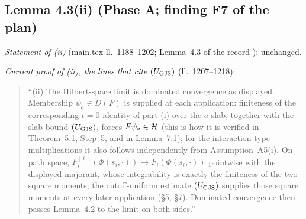 \subsection{Lemma 4.3(ii) (Phase A; finding F7 of the plan)}\label{sub:cons-43}

\emph{Statement of (ii)} (main.tex ll.~1188--1202; Lemma~4.3 of the record \cite[p.~17]{R}):
unchanged.

\emph{Current proof of (ii), the lines that cite $(U_{\rm GJS})$} (ll.~1207--1218):
\begin{quote}\small
``(ii) The Hilbert-space limit is dominated convergence as displayed. Membership
$\psi_a\in D(F)$ is supplied at each application: finiteness of the corresponding $t=0$ identity
of part (i) over the $a$-slab, together with the slab bound $(U_{\rm GJS})$, forces $F\psi_a\in\mathcal{H}$
(this is how it is verified in Theorem~5.1, Step~5, and in Lemma~7.1); for the interaction-type
multiplications it also follows independently from Assumption~A5(i). On path space,
$F_i^{[\ell]}(\Phi(s_i,\cdot))\to F_i(\Phi(s_i,\cdot))$ pointwise with the displayed majorant,
whose integrability is exactly the finiteness of the two square moments; the cutoff-uniform
estimate $(U_{\rm GJS})$ supplies those square moments at every later application (\S5, \S7). Dominated
convergence then passes Lemma~4.2 to the limit on both sides.''
\end{quote}

